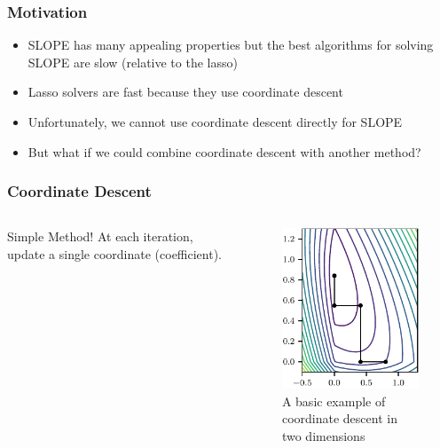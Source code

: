 \documentclass[10pt]{beamer}
\begin{document}
\begin{frame}[c]
  \frametitle{Motivation}

  \begin{itemize}
    \item SLOPE has many appealing properties but the best algorithms for solving SLOPE are slow
          (relative to the lasso)
    \item Lasso solvers are fast because they use coordinate descent
    \item Unfortunately, we cannot use coordinate descent directly for SLOPE
    \item But what if we could combine coordinate descent with another method?
  \end{itemize}
\end{frame}

\begin{frame}
  \frametitle{Coordinate Descent}

  \begin{columns}[c]
    \begin{column}{0.45\textwidth}
      \begin{exampleblock}{Simple Method!}
        At each iteration, update a single coordinate (coefficient).
      \end{exampleblock}
    \end{column}
    \begin{column}{0.45\textwidth}
      \begin{figure}[htpb]
        \centering
        \includegraphics[]{figures/paper5-cd.pdf}
        \caption{%
          A basic example of coordinate descent in two dimensions
        }
      \end{figure}
    \end{column}
  \end{columns}
\end{frame}
\end{document}

